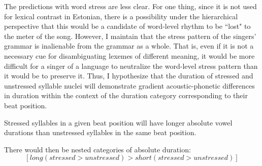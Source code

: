 The predictions with word stress are less clear. For one thing, since it is not used for lexical contrast in Estonian, there is a possibility under the hierarchical perspective that this would be a candidate of word-level rhythm to be ``lost" to the meter of the song. However, I maintain that the stress pattern of the singers' grammar is inalienable from the grammar as a whole. That is, even if it is not a necessary cue for disambiguating lexemes of different meaning, it would be more difficult for a singer of a language to neutralize the word-level stress pattern than it would be to preserve it. Thus, I hypothesize that the duration of stressed and unstressed syllable nuclei will demonstrate gradient acoustic-phonetic differences in duration within the context of the duration category corresponding to their beat position. 

\begin{hyp}

Stressed syllables in a given beat position will have longer absolute vowel durations than unstressed syllables in the same beat position. 
\end{hyp} 

There would then be nested categories of absolute duration: \[[long (stressed > unstressed) > short (stressed > unstressed)]\]
%	 
%
%

